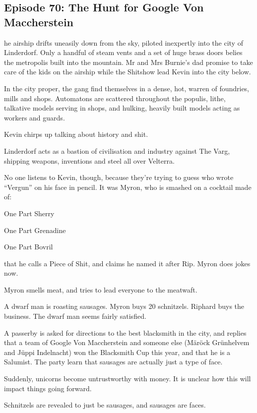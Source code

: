 \subsection{Episode 70: The Hunt for Google Von Maccherstein}

he airship drifts uneasily down from the sky, piloted inexpertly into the city of Linderdorf. Only a handful of steam vents and a set of huge brass doors belies the metropolis built into the mountain. Mr and Mrs Burnie’s dad promise to take care of the kids on the airship while the Shitshow lead Kevin into the city below.\medskip

In the city proper, the gang find themselves in a dense, hot, warren of foundries, mills and shops. Automatons are scattered throughout the populis, lithe, talkative models serving in shops, and hulking, heavily built models acting as workers and guards.\medskip

Kevin chirps up talking about history and shit.\medskip

Linderdorf acts as a bastion of civilisation and industry against The Varg, shipping weapons, inventions and steel all over Velterra.\medskip

No one listens to Kevin, though, because they’re trying to guess who wrote “Vergun” on his face in pencil. It was Myron, who is smashed on a cocktail made of:\medskip

One Part Sherry\medskip

One Part Grenadine\medskip

One Part Bovril\medskip

that he calls a Piece of Shit, and claims he named it after Rip. Myron does jokes now.\medskip

Myron smells meat, and tries to lead everyone to the meatwaft.\medskip

A dwarf man is roasting sausages. Myron buys 20 schnitzels. Riphard buys the business. The dwarf man seems fairly satisfied.\medskip

A passerby is asked for directions to the best blacksmith in the city, and replies that a team of Google Von Maccherstein and someone else (Märöck Grünhelvem and Jüppi Indelnacht) won the Blacksmith Cup this year, and that he is a Salumist. The party learn that sausages are actually just a type of face.\medskip

Suddenly, unicorns become untrustworthy with money. It is unclear how this will impact things going forward.\medskip

Schnitzels are revealed to just be sausages, and sausages are faces.\medskip


